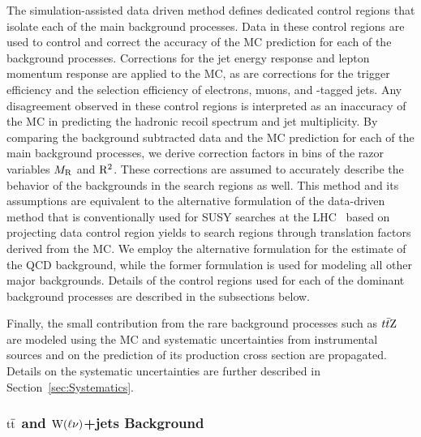 The simulation-assisted data driven method defines dedicated control regions that isolate
each of the main background processes. Data in these control regions are used 
to control and correct the accuracy of the MC prediction for each of the
background processes. Corrections for the jet energy response and lepton momentum response
are applied to the MC, as are corrections for the trigger 
efficiency and the selection efficiency of electrons, muons, and \PQb-tagged jets. Any
disagreement observed in these control regions is interpreted as an inaccuracy of the 
MC in predicting the hadronic recoil spectrum and jet multiplicity.
By comparing the background subtracted data and the MC prediction
for each of the main background processes, we derive correction factors in bins of
the razor variables $M_\mathrm{R}$ and $\mathrm{R}^2$. These corrections are assumed to accurately
describe the behavior of the backgrounds in the search regions as well. This method
and its assumptions are equivalent to the alternative formulation of the data-driven method
that is conventionally used for SUSY searches at the 
LHC~\cite{SUS12024,MT2at8TeV,Aad:2013wta}
based on projecting data control region yields to search regions through translation 
factors derived from the MC. We employ the alternative formulation
for the estimate of the QCD background, while the former formulation is used for
modeling all other major backgrounds. Details of the control regions used for each of 
the dominant background processes are described in the subsections below.

Finally, the small contribution from the rare background processes such as $t\bar{t}\mathrm{Z}$ are 
modeled using the MC and systematic uncertainties from instrumental sources and on the prediction of its 
production cross section are propagated. Details on the systematic uncertainties are further described
in Section~\ref{sec:Systematics}.


\subsubsection{$\mathrm{t}\overline{\mathrm{t}}$ and $\mathrm{W}(\ell\nu)$+jets Background}
\label{sec:TTBarWJetsCR}

